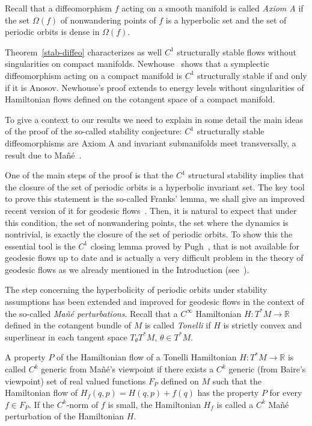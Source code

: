 \documentclass[AHL,Unicode,longabstracts,published]{cedram}
\newcommand{\bbR}{\mathbb{R}}
\begin{document}
Recall that a diffeomorphism $f$ acting on a smooth manifold is called \emph{Axiom A} if the set $\Omega(f)$ of nonwandering points of $f$ is a hyperbolic set and the set of periodic orbits is dense in $\Omega(f)$.

Theorem~\ref{stab-diffeo} characterizes as well $C^{1}$ structurally stable flows without singularities on compact manifolds. Newhouse~\cite{kn:Newhouse} shows that a symplectic diffeomorphism acting on a compact manifold is $C^{1}$ structurally stable if and only if it is Anosov. Newhouse's proof extends to energy levels without singularities of Hamiltonian flows defined on the cotangent space of a compact manifold.

To give a context to our results we need to explain in some detail the main ideas of the proof of the so-called stability conjecture: $C^{1}$ structurally stable diffeomorphisms are Axiom A and invariant submanifolds meet transversally, a result due to Mañé~\cite{kn:Mane}.

One of the main steps of the proof is that the $C^{1}$ structural stability implies that the closure of the set of periodic orbits is a hyperbolic invariant set. The key tool to prove this statement is the so-called Franks' lemma, we shall give an improved recent version of it for geodesic flows~\cite{kn:ARR}. Then, it is natural to expect that under this condition, the set of nonwandering points, the set where the dynamics is nontrivial, is exactly the closure of the set of periodic orbits. To show this the essential tool is the $C^{1}$ closing lemma proved by Pugh~\cite{kn:Pugh}, that is not available for geodesic flows up to date and is actually a very difficult problem in the theory of geodesic flows as we already mentioned in the Introduction (see~\cite{kn:Rifford}).

The step concerning the hyperbolicity of periodic orbits under stability assumptions has been extended and improved for geodesic flows in the context of the so-called \emph{Mañé perturbations}. Recall that a $C^{\infty}$ Hamiltonian $H:T^{*}M \longrightarrow \bbR$ defined in the cotangent bundle of $M$ is called \emph{Tonelli} if $H$ is strictly convex and superlinear in each tangent space $T_{\theta}T^{*}M$, $\theta \in T^{*}M$.

\begin{defi}\label{Mane-genericity}
A property $P$ of the Hamiltonian flow of a Tonelli Hamiltonian $H: T^{*}M \longrightarrow \bbR$ is called $C^{k}$ generic from Mañé's viewpoint if there exists a $C^{k}$ generic (from Baire's viewpoint) set of real valued functions $F_{P}$ defined on $M$ such that the Hamiltonian flow of $H_{f}(q,p) = H(q,p) + f(q)$ has the property $P$ for every $f \in F_{P}$. If the $C^{k}$-norm of $f$ is small, the Hamiltonian $H_{f}$ is called a $C^{k}$ Mañé perturbation of the Hamiltonian $H$.
\end{defi}
\end{document}
